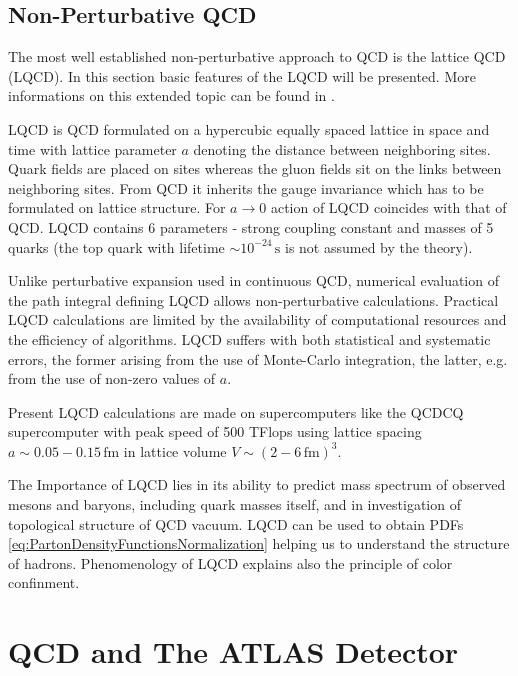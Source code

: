 \documentclass[a4paper,11pt]{report}
\begin{document}
\section{Non-Perturbative QCD}

The most well established non-perturbative approach to QCD is the lattice QCD
(LQCD). In this section basic features of the LQCD will be presented.  More
informations on this extended topic can be found in \cite{QCDTextbook,LQCDIntro}.

LQCD is QCD formulated on a hypercubic equally spaced lattice in space and time
with lattice parameter $a$ denoting the distance between neighboring sites.
Quark fields are placed on sites whereas the gluon fields sit on the links
between neighboring sites. From QCD it inherits the gauge invariance which has
to be formulated on lattice structure.  For $a \rightarrow 0$ action of LQCD
coincides with that of QCD. LQCD contains 6 parameters - strong coupling
constant and masses of 5 quarks (the top quark with lifetime $ \sim
10^{-24}\,\text{s}$ is not assumed by the theory).

Unlike perturbative expansion used in continuous QCD, numerical evaluation of
the path integral defining LQCD allows non-perturbative calculations.  Practical
LQCD calculations are limited by the availability of computational resources and
the efficiency of algorithms. LQCD suffers with both statistical and systematic
errors, the former arising from the use of Monte-Carlo integration, the latter,
e.g. from the use of non-zero values of $a$.

Present LQCD calculations are made on supercomputers like the QCDCQ
supercomputer \cite{SuperComputer} with peak speed of 500 TFlops using lattice
spacing $a \sim 0.05 - 0.15 \, \text{fm}$ in lattice volume $V \sim (2 - 6
\,\text{fm} )^3$.

The Importance of LQCD lies in its ability to predict mass spectrum of observed
mesons and baryons, including quark masses itself, and in investigation of
topological structure of QCD vacuum.  LQCD can be used to obtain PDFs
\eqref{eq:PartonDensityFunctionsNormalization} helping us to understand the
structure of hadrons. Phenomenology of LQCD explains also the principle of color
confinment. 


\chapter{QCD and The ATLAS Detector}

\end{document}
